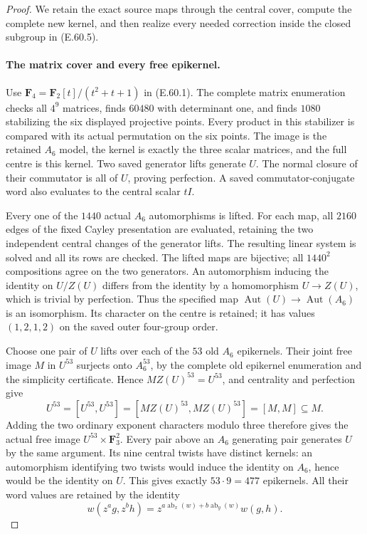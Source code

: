 \begin{proof}
We retain the exact source maps through the central cover, compute
the complete new kernel, and then realize every needed correction
inside the closed subgroup in \textup{(E.60.5)}.

\paragraph{The matrix cover and every free epikernel.}
Use $\mathbf F_4=\mathbf F_2[t]/(t^2+t+1)$ in
\textup{(E.60.1)}. The complete matrix enumeration checks all
$4^9$ matrices, finds $60480$ with determinant one, and finds
$1080$ stabilizing the six displayed projective points.
Every product in this stabilizer is compared with its actual
permutation on the six points. The image is the retained $A_6$
model, the kernel is exactly the three scalar matrices, and
the full centre is this kernel. Two saved generator lifts
generate $U$. The normal closure of their commutator is all
of $U$, proving perfection. A saved commutator-conjugate word
also evaluates to the central scalar $tI$.

Every one of the $1440$ actual $A_6$ automorphisms is lifted.
For each map, all $2160$ edges of the fixed Cayley presentation
are evaluated, retaining the two independent central changes
of the generator lifts. The resulting linear system is solved
and all its rows are checked. The lifted maps are bijective;
all $1440^2$ compositions agree on the two generators.
An automorphism inducing the identity on $U/Z(U)$ differs
from the identity by a homomorphism $U\to Z(U)$, which is
trivial by perfection. Thus the specified map
$\operatorname{Aut}(U)\to\operatorname{Aut}(A_6)$ is an
isomorphism. Its character on the centre is retained; it
has values $(1,2,1,2)$ on the saved outer four-group order.

Choose one pair of $U$ lifts over each of the $53$ old
$A_6$ epikernels. Their joint free image $M$ in $U^{53}$
surjects onto $A_6^{53}$, by the complete old epikernel
enumeration and the simplicity certificate. Hence
$MZ(U)^{53}=U^{53}$, and centrality and perfection give
\[
 U^{53}=[U^{53},U^{53}]
       =[MZ(U)^{53},MZ(U)^{53}]=[M,M]\subseteq M.
 \tag{E.60.7}
\]
Adding the two ordinary exponent characters modulo three
therefore gives the actual free image $U^{53}\times\mathbf F_3^2$.
Every pair above an $A_6$ generating pair generates $U$ by
the same argument. Its nine central twists have distinct
kernels: an automorphism identifying two twists would induce
the identity on $A_6$, hence would be the identity on $U$.
This gives exactly $53\cdot9=477$ epikernels. All their word
values are retained by the identity
\[
 w(z^a g,z^b h)
   =z^{a\operatorname{ab}_x(w)+b\operatorname{ab}_y(w)}w(g,h).
 \tag{E.60.8}
\]


\end{proof}

